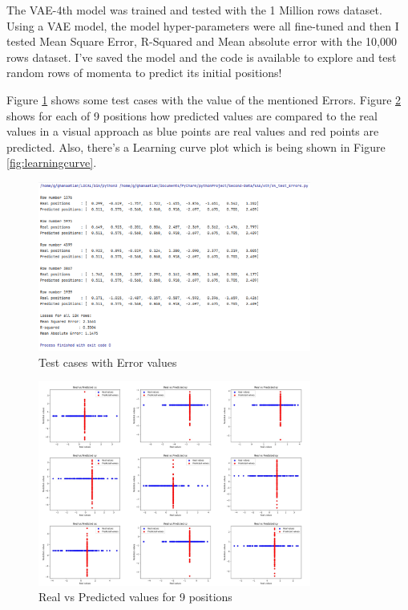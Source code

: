 \documentclass{article}
\begin{document}
The VAE-4th model was trained and tested with the 1 Million rows dataset. Using a VAE model, the model hyper-parameters were all fine-tuned and then I tested Mean Square Error, R-Squared and Mean absolute error with the 10,000 rows dataset. I've saved the model and the code is available to explore and test random rows of momenta to predict its initial positions! 

Figure \ref{fig:testcases} shows some test cases with the value of the mentioned Errors. Figure \ref{fig:realvspredicted} shows for each of 9 positions how predicted values are compared to the real values in a visual approach as blue points are real values and red points are predicted. Also, there's a Learning curve plot which is being shown in Figure \ref{fig:learningcurve}.

\begin{figure}[h]
    \centering
    \includegraphics[width=0.8\textwidth]{VAE4th-testcases.png}
    \caption{Test cases with Error values}
    \label{fig:testcases}
\end{figure}

\begin{figure}[h]
    \centering
    \includegraphics[width=0.8\textwidth]{VAE4th_REALvsPREDICTED.png}
    \caption{Real vs Predicted values for 9 positions}
    \label{fig:realvspredicted}
\end{figure}
\end{document}
